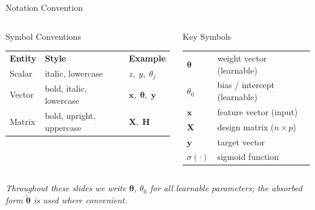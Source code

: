 \documentclass[aspectratio=169,11pt]{beamer}
\begin{document}
\begin{frame}{Notation Convention}
\begin{center}
\end{center}

\vspace{0.5em}
\begin{columns}[T]
\begin{block}{Symbol Conventions}
\begin{tabular}{lll}
  \textbf{Entity} & \textbf{Style} & \textbf{Example} \\[0.3em]
  Scalar & italic, lowercase & $z,\; y,\; \theta_j$ \\
  Vector & bold, italic, lowercase & $\boldsymbol{x},\; \boldsymbol{\theta},\; \boldsymbol{y}$ \\
  Matrix & bold, upright, uppercase & $\mathbf{X},\; \mathbf{H}$
\end{tabular}
\end{block}

\begin{block}{Key Symbols}
\begin{tabular}{ll}
  $\boldsymbol{\theta}$ & weight vector (learnable) \\
  $\theta_0$            & bias / intercept (learnable) \\
  $\boldsymbol{x}$      & feature vector (input) \\
  $\mathbf{X}$          & design matrix ($n \times p$) \\
  $\boldsymbol{y}$      & target vector \\
  $\sigma(\cdot)$       & sigmoid function
\end{tabular}
\end{block}
\end{columns}

\smallskip
\centering\footnotesize\textit{Throughout these slides we write $\boldsymbol{\theta}$, $\theta_0$ for all learnable parameters; the absorbed form $\tilde{\boldsymbol{\theta}}$ is used where convenient.}
\end{frame}
\end{document}
